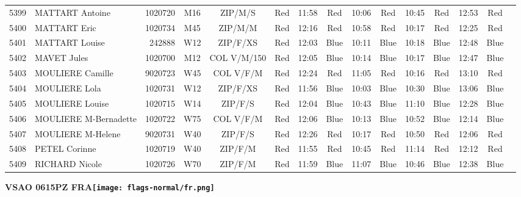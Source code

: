 \documentclass{report}
\begin{document}
\begin{longtable}{|c|l|r|c|c|*{5}{cc|}}
    5399 & MATTART Antoine & 1020720 & M16 & ZIP/M/S & Red & 11:58 & Red & 10:06 & Red & 10:45 & Red & 12:53 & Red &  \\
    5400 & MATTART Eric & 1020734 & M45 & ZIP/M/M & Red & 12:16 & Red & 10:58 & Red & 10:17 & Red & 12:25 & Red &  \\
    5401 & MATTART Louise & 242888 & W12 & ZIP/F/XS & Red & 12:03 & Blue & 10:11 & Blue & 10:18 & Blue & 12:48 & Blue &  \\
    5402 & MAVET Jules & 1020700 & M12 & COL V/M/150 & Red & 12:05 & Blue & 10:14 & Blue & 10:17 & Blue & 12:47 & Blue &  \\
    5403 & MOULIERE Camille & 9020723 & W45 & COL V/F/M & Red & 12:24 & Red & 11:05 & Red & 10:16 & Red & 13:10 & Red &  \\
    5404 & MOULIERE Lola & 1020731 & W12 & ZIP/F/XS & Red & 11:56 & Blue & 10:03 & Blue & 10:30 & Blue & 13:06 & Blue &  \\
    5405 & MOULIERE Louise & 1020715 & W14 & ZIP/F/S & Red & 12:04 & Blue & 10:43 & Blue & 11:10 & Blue & 12:28 & Blue &  \\
    5406 & MOULIERE M-Bernadette & 1020722 & W75 & COL V/F/M & Red & 12:06 & Blue & 10:13 & Blue & 10:52 & Blue & 12:14 & Blue &  \\
    5407 & MOULIERE M-Helene & 9020731 & W40 & ZIP/F/S & Red & 12:26 & Red & 10:17 & Red & 10:50 & Red & 12:06 & Red &  \\
    5408 & PETEL Corinne & 1020719 & W40 & ZIP/F/M & Red & 11:55 & Red & 10:45 & Red & 11:14 & Red & 12:12 & Red &  \\
    5409 & RICHARD Nicole & 1020726 & W70 & ZIP/F/M & Red & 11:59 & Blue & 11:07 & Blue & 10:46 & Blue & 12:38 & Blue &  \\
  \end{longtable}
\newpage
  \Huge \centering \bfseries VSAO 0615PZ FRA\normalfont \footnotesize \sffamily \hfill \texttt{[image: flags-normal/fr.png]} \newline 
\end{document}
